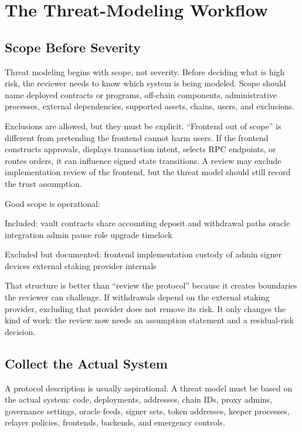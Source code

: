 \section{The Threat-Modeling Workflow}

\subsection{Scope Before Severity}

Threat modeling begins with scope, not severity. Before deciding what is high risk, the reviewer needs to know which system is being modeled. Scope should name deployed contracts or programs, off-chain components, administrative processes, external dependencies, supported assets, chains, users, and exclusions.

Exclusions are allowed, but they must be explicit. ``Frontend out of scope'' is different from pretending the frontend cannot harm users. If the frontend constructs approvals, displays transaction intent, selects RPC endpoints, or routes orders, it can influence signed state transitions. A review may exclude implementation review of the frontend, but the threat model should still record the trust assumption.

Good scope is operational:

\begin{codeblock}
Included:
    vault contracts
    share accounting
    deposit and withdrawal paths
    oracle integration
    admin pause role
    upgrade timelock

Excluded but documented:
    frontend implementation
    custody of admin signer devices
    external staking provider internals
\end{codeblock}

That structure is better than ``review the protocol'' because it creates boundaries the reviewer can challenge. If withdrawals depend on the external staking provider, excluding that provider does not remove its risk. It only changes the kind of work: the review now needs an assumption statement and a residual-risk decision.

\subsection{Collect the Actual System}

A protocol description is usually aspirational. A threat model must be based on the actual system: code, deployments, addresses, chain IDs, proxy admins, governance settings, oracle feeds, signer sets, token addresses, keeper processes, relayer policies, frontends, backends, and emergency controls.

